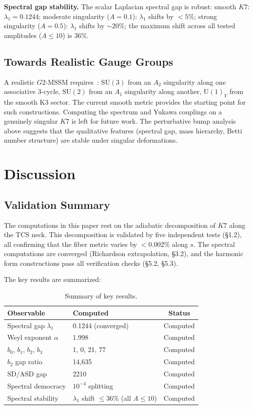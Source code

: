 \documentclass[11pt,a4paper]{article}
\newcommand{\Gtwo}{\mathrm{G}_2}
\newcommand{\Kseven}{K_7}
\newcommand{\SU}{\mathrm{SU}}
\newcommand{\U}{\mathrm{U}}
\newcommand{\SD}{\mathrm{SD}}
\newcommand{\ASD}{\mathrm{ASD}}
\newcommand{\MSSM}{\mathrm{MSSM}}
\theoremstyle{remark}
\def\Gtwo{G2}%
\def\Kseven{K7}%
\begin{document}
\textbf{Spectral gap stability.} The scalar Laplacian spectral gap is robust:
smooth $\Kseven$: $\lambda_1 = 0.1244$; moderate singularity ($A = 0.1$): $\lambda_1$ shifts by $< 5\%$;
strong singularity ($A = 0.5$): $\lambda_1$ shifts by $\sim 20\%$;
the maximum shift across all tested amplitudes ($A \leq 10$) is $36\%$.

\subsection{Towards Realistic Gauge Groups}

A realistic $\Gtwo$-$\MSSM$ requires~\cite{ref2,ref3}:
$\SU(3)$ from an $A_2$ singularity along one associative 3-cycle,
$\SU(2)$ from an $A_1$ singularity along another,
$\U(1)_Y$ from the smooth K3 sector.
The current smooth metric provides the starting point for such constructions.
Computing the spectrum and Yukawa couplings on a genuinely singular $\Kseven$ is left for
future work. The perturbative bump analysis above suggests that the qualitative
features (spectral gap, mass hierarchy, Betti number structure) are stable under
singular deformations.

\section{Discussion}

\subsection{Validation Summary}

The computations in this paper rest on the adiabatic decomposition of $\Kseven$ along the
TCS neck. This decomposition is validated by five independent tests (\S1.2), all
confirming that the fiber metric varies by $< 0.002\%$ along $s$. The spectral
computations are converged (Richardson extrapolation, \S3.2), and the harmonic form
constructions pass all verification checks (\S5.2, \S5.3).

The key results are summarized:

\begin{table}[htbp]
\centering
\small
\begin{tabular}{llc}
\toprule
Observable & Computed & Status \\
\midrule
Spectral gap $\lambda_1$ & 0.1244 (converged) & Computed \\
Weyl exponent $\alpha$ & 1.998 & Computed \\
$b_0$, $b_1$, $b_2$, $b_3$ & 1, 0, 21, 77 & Computed \\
$b_2$ gap ratio & 14,635 & Computed \\
$\SD/\ASD$ gap & 2210 & Computed \\
Spectral democracy & $10^{-4}$ splitting & Computed \\
Spectral stability & $\lambda_1$ shift $\leq 36\%$ (all $A \leq 10$) & Computed \\
\bottomrule
\end{tabular}
\caption{Summary of key results.}
\label{tab:summary}
\end{table}
\end{document}
